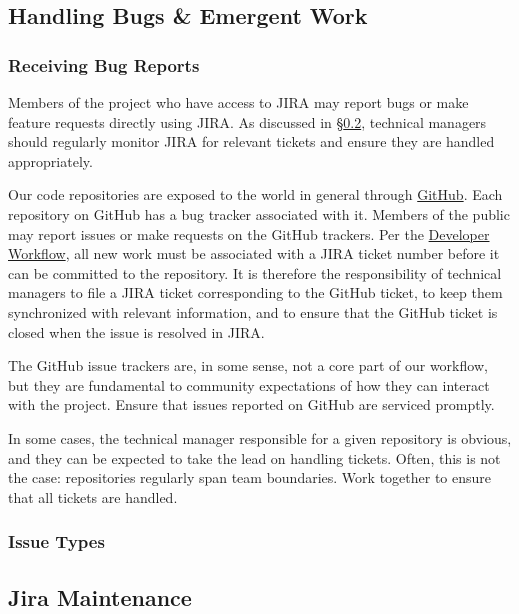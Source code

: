 \subsection{Handling Bugs \& Emergent Work}
\label{sec:bugs}

\subsubsection{Receiving Bug Reports}\label{receiving-bug-reports}

Members of the project who have access to \gls{JIRA} may report bugs or make feature requests directly using \gls{JIRA}.
As discussed in \S\ref{sec:jira-maintenance}, technical managers should regularly monitor \gls{JIRA} for relevant tickets and ensure they are handled appropriately.

Our code repositories are exposed to the world in general through \href{https://github.com/lsst/}{GitHub}.
Each repository on GitHub has a bug tracker associated with it.
Members of the public may report issues or make requests on the GitHub trackers.
Per the \href{https://developer.lsst.io/processes/workflow.html}{Developer Workflow}, all new work must be associated with a \gls{JIRA} ticket number before it can be committed to the repository.
It is therefore the responsibility of technical managers to file a \gls{JIRA} ticket corresponding to the GitHub ticket, to keep them synchronized with relevant information, and to ensure that the GitHub ticket is closed when the issue is resolved in \gls{JIRA}.

The GitHub issue trackers are, in some sense, not a core part of our
workflow, but they are fundamental to community expectations of how they
can interact with the project. Ensure that issues reported on GitHub are
serviced promptly.

In some cases, the technical manager responsible for a given repository
is obvious, and they can be expected to take the lead on handling
tickets. Often, this is not the case: repositories regularly span team
boundaries. Work together to ensure that all tickets are handled.

\subsubsection{Issue Types}\label{issue-types}


\subsection{Jira Maintenance}
\label{sec:jira-maintenance}

